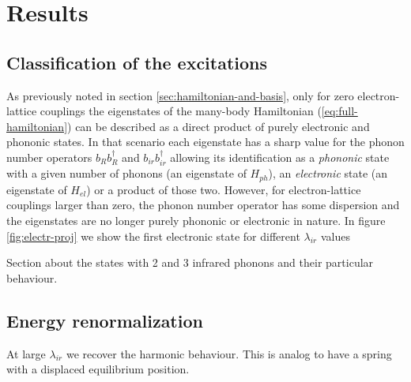 \chapter{Results}
\label{chap:results}


\section{Classification of the excitations}
\label{sec:classification}

As previously noted in section \ref{sec:hamiltonian-and-basis}, only for zero electron-lattice couplings the eigenstates of the many-body Hamiltonian (\ref{eq:full-hamiltonian}) can be described as a direct product of purely electronic and phononic states. 
In that scenario each eigenstate has a sharp value for the phonon number operators $b_Rb^\dagger_R$ and $b_{ir}b^\dagger_{ir}$ allowing its identification as a \textit{phononic} state with a given number of phonons (an eigenstate of $H_{ph}$), an \textit{electronic} state (an eigenstate of $H_{el}$) or a product of those two.
However, for electron-lattice couplings larger than zero, the phonon number operator has some dispersion and the eigenstates are no longer purely phononic or electronic in nature.
In figure \ref{fig:electr-proj} we show the first electronic state for different $\lambda_{ir}$ values





Section about the states with 2 and 3 infrared phonons and their particular behaviour.

\section{Energy renormalization}

At large $\lambda_{ir}$ we recover the harmonic behaviour. This is analog to have a spring with a displaced equilibrium position.

